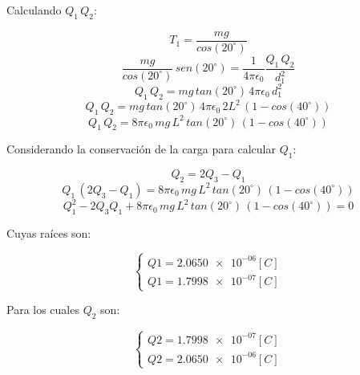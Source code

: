 \documentclass[letter,11pt]{article}
\begin{document}
\begin{enumerate}
Calculando $Q_1\,Q_2$:

\begin{equation*}
    T_1 = \frac{mg}{cos(20^\circ)}
\end{equation*}
\begin{equation*}
    \frac{mg}{cos(20^\circ)}\,sen(20^\circ) = \frac{1}{4\pi\epsilon_0}\frac{Q_1\,Q_2}{d^2_1}
\end{equation*}
\begin{equation*}
    Q_1\,Q_2 = mg\,tan(20^\circ)\,4\pi\epsilon_0\,d^2_1
\end{equation*}
\begin{equation*}
    Q_1\,Q_2 = mg\,tan(20^\circ)\,4\pi\epsilon_0\,2L^2\,(1-cos(40^\circ))
\end{equation*}
\begin{equation*}
    Q_1\,Q_2 = 8\pi\epsilon_0\,mg\,L^2\,tan(20^\circ)\,(1-cos(40^\circ))
\end{equation*}

Considerando la conservación de la carga para calcular $Q_1$:

\begin{equation*}
    Q_2 = 2Q_3 - Q_1
\end{equation*}
\begin{equation*}
    Q_1\,(2Q_3 - Q_1) = 8\pi\epsilon_0\,mg\,L^2\,tan(20^\circ)\,(1-cos(40^\circ))
\end{equation*}
\begin{equation*}
    Q^2_1-2Q_3Q_1+8\pi\epsilon_0\,mg\,L^2\,tan(20^\circ)\,(1-cos(40^\circ))=0
\end{equation*}

Cuyas raíces son:

\begin{equation*}
    \begin{cases}
        Q1 = \num{2.0650e-06} [C] \\
        Q1 = \num{1.7998e-07} [C]
    \end{cases}
\end{equation*}

Para los cuales $Q_2$ son:

\begin{equation*}
    \begin{cases}
        Q2 = \num{1.7998e-07} [C] \\
        Q2 = \num{2.0650e-06} [C]
    \end{cases}
\end{equation*}
\\


\end{enumerate}
\end{document}
